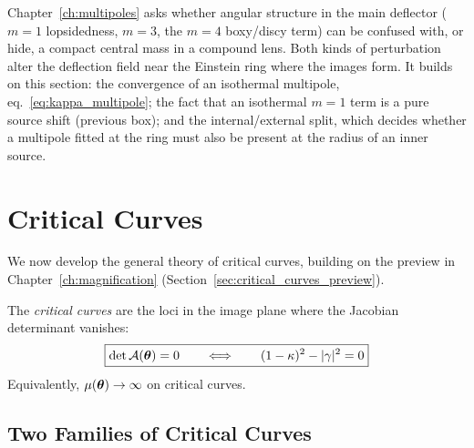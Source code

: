 \begin{bridge}
Chapter~\ref{ch:multipoles} asks whether angular structure in the main
deflector ($m = 1$ lopsidedness, $m = 3$, the $m = 4$ boxy/discy term) can be
confused with, or hide, a compact central mass in a compound lens.  Both kinds
of perturbation alter the deflection field near the Einstein ring where the
images form.  It builds on this section: the convergence of an isothermal
multipole, eq.~\eqref{eq:kappa_multipole}; the fact that an isothermal $m = 1$
term is a pure source shift (previous box); and the internal/external split,
which decides whether a multipole fitted at the ring must also be present at
the radius of an inner source.
\end{bridge}



\section{Critical Curves}
\label{sec:critical_curves}

We now develop the general theory of critical curves, building on
the preview in Chapter~\ref{ch:magnification}
(Section~\ref{sec:critical_curves_preview}).

\begin{definition}
The \emph{critical curves} are the loci in the image plane where
the Jacobian determinant vanishes:
\begin{equation}
    \boxed{
    \det\mathcal{A}(\boldsymbol{\theta}) = 0
    \qquad \Longleftrightarrow \qquad
    (1 - \kappa)^2 - |\gamma|^2 = 0
    }
    \label{eq:critical_curve_def}
\end{equation}
Equivalently, $\mu(\boldsymbol{\theta}) \to \infty$ on critical curves.
\end{definition}

\subsection{Two Families of Critical Curves}

